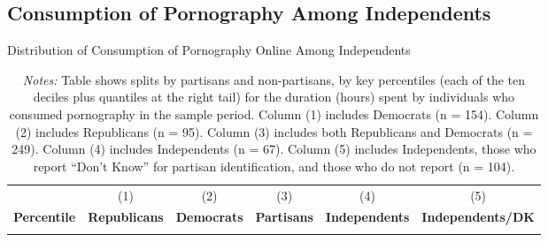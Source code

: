 \documentclass[12pt, letterpaper]{article}
\begin{document}
\subsection{Consumption of Pornography Among Independents}
\label{si:independents}
\begin{table}[ht] \centering \small \setlength\tabcolsep{6 pt}
	\caption{Distribution of Consumption of Pornography Online Among Independents}
	\label{tab:percentiles_duration_adultsites_by_individuals_independents_partisans}
	\begin{adjustbox}{max width=\textwidth}
		\begin{tabular}{@{\hspace{0\tabcolsep}}crrrrr@{\hspace{0\tabcolsep}}}
			\toprule		
			&\multicolumn{1}{c}{(1)}&\multicolumn{1}{c}{(2)}&\multicolumn{1}{c}{(3)}&\multicolumn{1}{c}{(4)}&\multicolumn{1}{c}{(5)}\\	
			\multicolumn{1}{l}{\textbf{Percentile}}&\multicolumn{1}{c}{\textbf{Republicans}}&\multicolumn{1}{c}{\textbf{Democrats}}&\multicolumn{1}{c}{\textbf{Partisans}}&\multicolumn{1}{c}{\textbf{Independents}}&\multicolumn{1}{r}{\textbf{Independents/DK}}\\
			\midrule
			\\
			\bottomrule
		\end{tabular}
	\end{adjustbox}
	\caption*{\footnotesize \emph{Notes:} 
		Table shows splits by partisans and non-partisans, by key percentiles (each of the ten deciles plus quantiles at the right tail) for the duration (hours) spent by individuals who consumed pornography in the sample period. 
		Column (1) includes Democrats (n = 154).
		Column (2) includes Republicans (n = 95).
		Column (3) includes both Republicans and Democrats (n = 249).
		Column (4) includes Independents (n = 67).
		Column (5) includes Independents, those who report ``Don't Know'' for partisan identification, and those who do not report (n = 104).
	}
\end{table}
\end{document}

